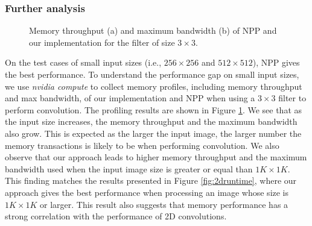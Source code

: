 \subsubsection{Further analysis}
\begin{figure}[t!]
\centering


	
\caption{Memory throughput (a) and maximum bandwidth (b) of NPP and our implementation for the filter of size $3 \times 3$.}
\label{fig:2dmemanaly}
\vspace{-5mm}
\end{figure}

On the test cases of small input sizes (i.e., $256 \times 256$ and $512 \times 512$), NPP gives the best performance. To understand the
performance gap on small input sizes, we use \emph{nvidia compute} to collect memory profiles, including memory throughput and max
bandwidth, of our implementation and NPP when using a $3 \times 3$ filter to perform convolution. The profiling results are shown in Figure
\ref{fig:2dmemanaly}.  We see that as the input size increases, the memory throughput and the maximum bandwidth also grow. This is expected
as the larger the input image, the larger number the memory transactions is likely to be when performing convolution.  We also observe that
our approach leads to higher memory throughput and the maximum bandwidth used when the input image size is greater or equal than $1K \times
1K$. This finding matches the results presented in Figure \ref{fig:2druntime}, where our approach gives the best performance when
processing an image whose size is $1K \times 1K$ or larger. This result also suggests that memory performance has a strong correlation with
the performance of 2D convolutions.


